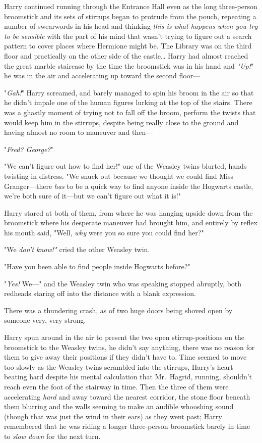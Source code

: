 Harry continued running through the Entrance Hall even as the long three-person 
broomstick and its sets of stirrups began to protrude from the pouch, repeating 
a number of swearwords in his head and thinking \emph{this is what happens when 
you try to be sensible} with the part of his mind that wasn't trying to figure 
out a search pattern to cover places where Hermione might be. The Library was 
on the third floor and practically on the other side of the castle{\ldots} 
Harry had almost reached the great marble staircase by the time the broomstick 
was in his hand and \emph{"Up!}" he was in the air and accelerating up toward 
the second floor---

"\emph{Gah!}" Harry screamed, and barely managed to spin his broom in the air 
so that he didn't impale one of the human figures lurking at the top of the 
stairs. There was a ghastly moment of trying not to fall off the broom, perform 
the twists that would keep him in the stirrups, despite being really close to 
the ground and having almost no room to maneuver and then---

"\emph{Fred? George?}"

"We can't figure out how to find her!" one of the Weasley twins blurted, hands 
twisting in distress. "We snuck out because we thought we could find Miss 
Granger---there \emph{has} to be a quick way to find anyone inside the Hogwarts 
castle, we're both sure of it---but we can't figure out what it is!"

Harry stared at both of them, from where he was hanging upside down from the 
broomstick where his desperate maneuver had brought him, and entirely by reflex 
his mouth said, "Well, \emph{why} were you so sure you could find her?"

"We \emph{don't know!"} cried the other Weasley twin.

"Have you been able to find people inside Hogwarts before?"

"\emph{Yes!} We---" and the Weasley twin who was speaking stopped abruptly, 
both redheads staring off into the distance with a blank expression.

There was a thundering crash, as of two huge doors being shoved open by someone 
very, very strong.

Harry spun around in the air to present the two open stirrup-positions on the 
broomstick to the Weasley twins, he didn't say anything, there was no reason 
for them to give away their positions if they didn't have to. Time seemed to 
move too slowly as the Weasley twins scrambled into the stirrups, Harry's heart 
beating hard despite his mental calculation that Mr.~Hagrid, running, shouldn't 
reach even the foot of the stairway in time. Then the three of them were 
accelerating \emph{hard} and away toward the nearest corridor, the stone floor 
beneath them blurring and the walls seeming to make an audible whooshing sound 
(though that was just the wind in their ears) as they went past; Harry 
remembered that he was riding a longer three-person broomstick barely in time 
to \emph{slow down} for the next turn.

